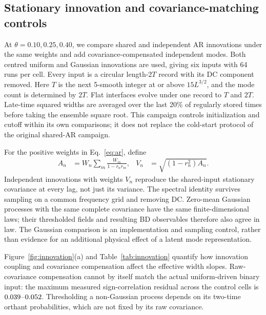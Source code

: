 \subsection{Stationary innovation and covariance-matching controls}
\label{sec:innovation}
\InnovationStageNotice{}
At $\theta=0.10,0.25,0.40$, we compare shared and independent AR innovations
under the same weights and add covariance-compensated independent modes.
Both centred uniform and Gaussian innovations are used, giving six inputs
with 64 runs per cell. Every input is a circular length-$2T$ record with its
DC component removed. Here $T$ is the next 5-smooth integer at or above
$15L^{3/2}$, and the mode count is determined by $2T$.
Flat interfaces evolve under one record to $T$
and $2T$. Late-time squared widths are averaged over the last 20\% of regularly
stored times before taking the ensemble square root. This campaign controls
initialization and cutoff within its own comparisons; it does not replace
the cold-start protocol of the original shared-AR campaign.

For the positive weights in Eq.~\eqref{eq:ar}, define
\begin{align}
 A_n&=W_n\sum_m\frac{W_m}{1-r_nr_m},&
 V_n&=\sqrt{(1-r_n^2)A_n}.
 \label{eq:innovationmatch}
\end{align}
Independent innovations with weights $V_n$ reproduce the shared-input
stationary covariance at every lag, not just its variance.
The spectral identity survives sampling on a common frequency grid and
removing DC. Zero-mean Gaussian processes with the same complete covariance
have the same finite-dimensional laws; their thresholded fields and resulting
BD observables therefore also agree in law. The Gaussian comparison is an
implementation and sampling control, rather than evidence for an additional
physical effect of a latent mode representation.

Figure~\ref{fig:innovation}(a) and Table~\ref{tab:innovation} quantify how
innovation coupling and covariance compensation affect the effective width
slopes. Raw-covariance compensation cannot by itself match the actual
uniform-driven binary input: the maximum measured sign-correlation residual
across the control cells is
$0.039$--$0.052$.
Thresholding a non-Gaussian process depends on its two-time orthant
probabilities, which are not fixed by its raw covariance.

